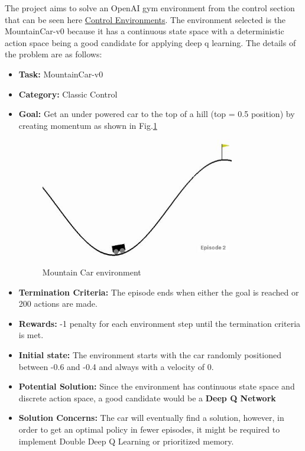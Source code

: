 The project aims to solve an OpenAI gym environment from the control section that can be seen here \href{https://gym.openai.com/envs/#classic_control}{Control Environments}. The environment selected is the MountainCar-v0 because it has a continuous state space with a deterministic action space being a good candidate for applying deep q learning. The details of the problem are as follows:
\begin{itemize}
\item \textbf{Task:} MountainCar-v0
\item \textbf{Category:} Classic Control
\item \textbf{Goal:} Get an under powered car to the top of a hill (top = 0.5 position) by creating momentum as shown in Fig.\ref{fig:car}
\begin{figure}[h]
\centering
\includegraphics[width=0.8\textwidth]{environment.jpg}
\caption{\label{fig:car} Mountain Car environment}
\end{figure}

\item \textbf{Termination Criteria:} The episode ends when either the goal is reached or 200 actions are made.
\item \textbf{Rewards:} -1 penalty for each environment step until the termination criteria is met.

\item \textbf{Initial state:} The environment starts with the car randomly positioned between -0.6 and -0.4 and always with a velocity of 0.
\item \textbf{Potential Solution:} Since the environment has continuous state space and discrete action space, a good candidate would be a \textbf{Deep Q Network}
\item \textbf{Solution Concerns:} The car will eventually find a solution, however, in order to get an optimal policy in fewer episodes, it might be required to implement Double Deep Q Learning or prioritized memory.

\end{itemize}


